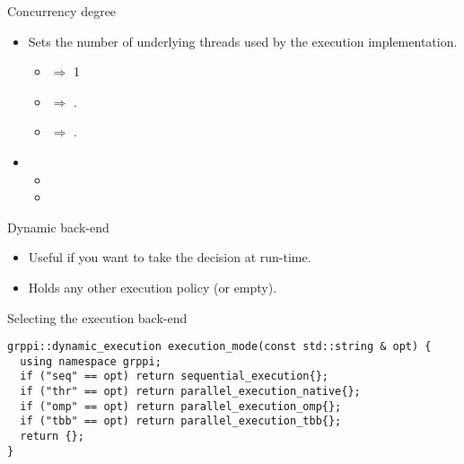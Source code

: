 \begin{frame}[t]{Concurrency degree}
\begin{itemize}
  \item Sets the number of underlying threads used by the execution implementation.
    \begin{itemize}
      \item {} $\Rightarrow$ 1
      \item {} $\Rightarrow$ .
      \item {} $\Rightarrow$ .
    \end{itemize}

  \vfill
  \item {}
    \begin{itemize}
      \item {}
      \item {}
    \end{itemize}
\end{itemize}
\end{frame}

\begin{frame}[t,fragile]{Dynamic back-end}
\begin{itemize}
  \item Useful if you want to take the decision at run-time.
  \item Holds any other execution policy (or empty).
\end{itemize}
\vfill\pause
\begin{block}{Selecting the execution back-end}
\begin{lstlisting}
grppi::dynamic_execution execution_mode(const std::string & opt) {
  using namespace grppi;
  if ("seq" == opt) return sequential_execution{};
  if ("thr" == opt) return parallel_execution_native{};
  if ("omp" == opt) return parallel_execution_omp{};
  if ("tbb" == opt) return parallel_execution_tbb{};
  return {};
}
\end{lstlisting}
\end{block}
\end{frame}

